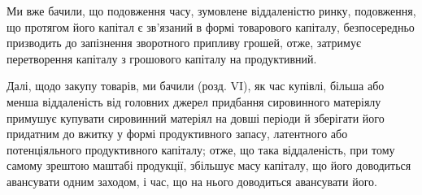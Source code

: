 Ми вже бачили, що подовження часу, зумовлене віддаленістю ринку,
подовження, що протягом його капітал є зв’язаний в формі товарового
капіталу, безпосередньо призводить до запізнення зворотного припливу
грошей, отже, затримує перетворення капіталу з грошового капіталу на
продуктивний.

Далі, щодо закупу товарів, ми бачили (розд. VI), як час купівлі,
більша або менша віддаленість від головних джерел придбання сировинного
матеріялу примушує купувати сировинний матеріял на довші періоди
й зберігати його придатним до вжитку у формі продуктивного запасу, латентного
або потенціяльного продуктивного капіталу; отже, що така
віддаленість, при тому самому зрештою маштабі продукції, збільшує масу
капіталу, що його доводиться авансувати одним заходом, і час, що на
нього доводиться авансувати його.

